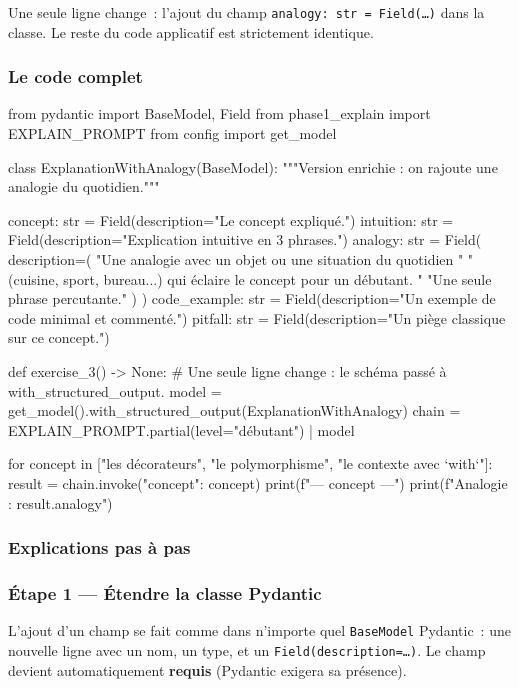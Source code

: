 \documentclass[11pt,a4paper]{article}
\begin{document}
Une seule ligne change~: l'ajout du champ \texttt{analogy: str = Field(\dots)}
dans la classe. Le reste du code applicatif est strictement identique.

\subsubsection{Le code complet}

\begin{pythoncode}
from pydantic import BaseModel, Field
from phase1_explain import EXPLAIN_PROMPT
from config import get_model


class ExplanationWithAnalogy(BaseModel):
    """Version enrichie : on rajoute une analogie du quotidien."""

    concept: str = Field(description="Le concept expliqué.")
    intuition: str = Field(description="Explication intuitive en 3 phrases.")
    analogy: str = Field(
        description=(
            "Une analogie avec un objet ou une situation du quotidien "
            "(cuisine, sport, bureau...) qui éclaire le concept pour un débutant. "
            "Une seule phrase percutante."
        )
    )
    code_example: str = Field(description="Un exemple de code minimal et commenté.")
    pitfall: str = Field(description="Un piège classique sur ce concept.")


def exercise_3() -> None:
    # Une seule ligne change : le schéma passé à with_structured_output.
    model = get_model().with_structured_output(ExplanationWithAnalogy)
    chain = EXPLAIN_PROMPT.partial(level="débutant") | model

    for concept in ["les décorateurs", "le polymorphisme", "le contexte avec `with`"]:
        result = chain.invoke({"concept": concept})
        print(f"\n--- {concept} ---")
        print(f"Analogie : {result.analogy}")
\end{pythoncode}

\subsubsection{Explications pas à pas}

\subsubsection*{Étape 1 — Étendre la classe Pydantic}

L'ajout d'un champ se fait comme dans n'importe quel \texttt{BaseModel}
Pydantic~: une nouvelle ligne avec un nom, un type, et un
\texttt{Field(description=\dots)}. Le champ devient automatiquement
\textbf{requis} (Pydantic exigera sa présence).
\end{document}
